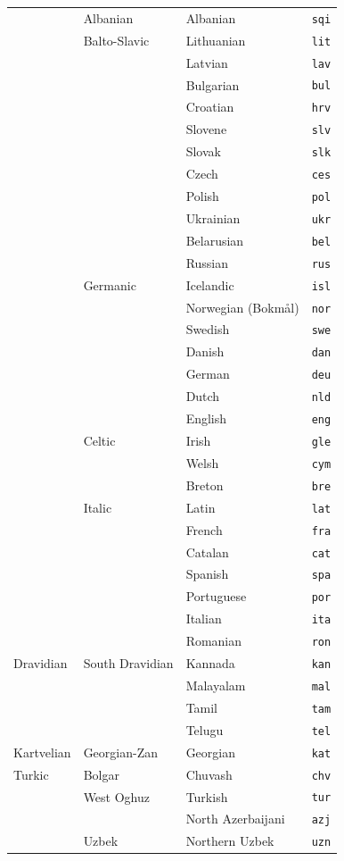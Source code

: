 \begin{center}
\begin{longtable}{llll}
&Albanian&Albanian&\texttt{sqi}\\
&Balto-Slavic&Lithuanian&\texttt{lit}\\
&&Latvian&\texttt{lav}\\
&&Bulgarian&\texttt{bul}\\
&&Croatian&\texttt{hrv}\\
&&Slovene&\texttt{slv}\\
&&Slovak&\texttt{slk}\\
&&Czech&\texttt{ces}\\
&&Polish&\texttt{pol}\\
&&Ukrainian&\texttt{ukr}\\
&&Belarusian&\texttt{bel}\\
&&Russian&\texttt{rus}\\
&Germanic&Icelandic&\texttt{isl}\\
&&Norwegian (Bokmål)&\texttt{nor}\\
&&Swedish&\texttt{swe}\\
&&Danish&\texttt{dan}\\
&&German&\texttt{deu}\\
&&Dutch&\texttt{nld}\\
&&English&\texttt{eng}\\
&Celtic&Irish&\texttt{gle}\\
&&Welsh&\texttt{cym}\\
&&Breton&\texttt{bre}\\
&Italic&Latin&\texttt{lat}\\
&&French&\texttt{fra}\\
&&Catalan&\texttt{cat}\\
&&Spanish&\texttt{spa}\\
&&Portuguese&\texttt{por}\\
&&Italian&\texttt{ita}\\
&&Romanian&\texttt{ron}\\
\hline
Dravidian&South Dravidian&Kannada&\texttt{kan}\\
&&Malayalam&\texttt{mal}\\
&&Tamil&\texttt{tam}\\
&&Telugu&\texttt{tel}\\
\hline
Kartvelian&Georgian-Zan&Georgian&\texttt{kat}\\
\hline
Turkic&Bolgar&Chuvash&\texttt{chv}\\
&West Oghuz&Turkish&\texttt{tur}\\
&&North Azerbaijani&\texttt{azj}\\
&Uzbek&Northern Uzbek&\texttt{uzn}\\

\end{longtable}
\end{center}
